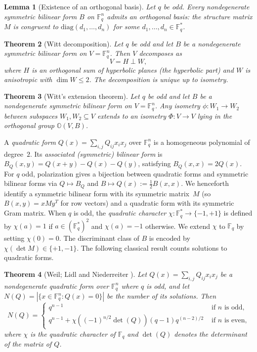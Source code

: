 \documentclass[11pt]{article}
\newcommand{\FF}{\mathbb{F}}
\newcommand{\0}{\mathbf{0}}
\newcommand{\1}{\mathbf{1}}
\theoremstyle{plain}
\newtheorem{theorem}{Theorem}[section]
\newtheorem{lemma}[theorem]{Lemma}
\theoremstyle{definition}
\theoremstyle{remark}
\begin{document}
\begin{lemma}[Existence of an orthogonal basis]\label{lem:orth_basis}
Let $q$ be odd. Every nondegenerate symmetric bilinear form $B$ on $\FF_q^n$ admits an orthogonal basis: the structure matrix $M$ is congruent to $\mathrm{diag}(d_1, \ldots, d_n)$ for some $d_1, \ldots, d_n \in \FF_q^*$.
\end{lemma}

\begin{theorem}[Witt decomposition]\label{thm:witt_decomp}
Let $q$ be odd and let $B$ be a nondegenerate symmetric bilinear form on $V = \FF_q^n$. Then $V$ decomposes as
\[
V = H \perp W,
\]
where $H$ is an orthogonal sum of hyperbolic planes (the \emph{hyperbolic part}) and $W$ is anisotropic with $\dim W \leq 2$. The decomposition is unique up to isometry.
\end{theorem}

\begin{theorem}[Witt's extension theorem]\label{thm:witt_extension}
Let $q$ be odd and let $B$ be a nondegenerate symmetric bilinear form on $V = \FF_q^n$. Any isometry $\phi: W_1 \to W_2$ between subspaces $W_1, W_2 \subseteq V$ extends to an isometry $\Phi: V \to V$ lying in the orthogonal group $\mathbb{O}(V, B)$.
\end{theorem}

A \emph{quadratic form} $Q(x) = \sum_{i,j} Q_{ij} x_i x_j$ over $\FF_q^n$ is a homogeneous polynomial of degree~$2$. Its \emph{associated (symmetric) bilinear form} is $B_Q(x,y) = Q(x+y) - Q(x) - Q(y)$, satisfying $B_Q(x,x) = 2Q(x)$. For $q$ odd, polarization gives a bijection between quadratic forms and symmetric bilinear forms via $Q \mapsto B_Q$ and $B \mapsto Q(x) := \tfrac{1}{2}B(x,x)$. We henceforth identify a symmetric bilinear form with its symmetric matrix~$M$ (so $B(x,y) = xMy^T$ for row vectors) and a quadratic form with its symmetric Gram matrix.
When $q$ is odd, the \emph{quadratic character} $\chi: \FF_q^* \to \{-1, +1\}$ is defined by $\chi(a) = 1$ if $a \in (\FF_q^*)^2$ and $\chi(a) = -1$ otherwise. We extend $\chi$ to $\FF_q$ by setting $\chi(0) = 0$. The discriminant class of $B$ is encoded by $\chi(\det M) \in \{+1, -1\}$. The following classical result counts solutions to quadratic forms.

\begin{theorem}[Weil; Lidl and Niederreiter {\cite{lidl1997finitefields}}]\label{thm:weil_lidl_niederreiter}
Let $Q(x) = \sum_{i,j} Q_{ij} x_i x_j$ be a nondegenerate quadratic form over $\mathbb{F}_q^n$ where $q$ is odd, and let $N(Q) = |\{x \in \mathbb{F}_q^n : Q(x) = 0\}|$ be the number of its solutions. Then
$$
N(Q) = \begin{cases}
    q^{n-1} & \textrm{ if $n$ is odd,} \\
    q^{n-1} + \chi((-1)^{n/2} \det(Q))(q-1)q^{(n-2)/2} & \textrm{ if $n$ is even,}
\end{cases}
$$
where $\chi$ is the quadratic character of $\mathbb{F}_q$ and $\det(Q)$ denotes the determinant of the matrix of $Q$.
\end{theorem}
\end{document}
